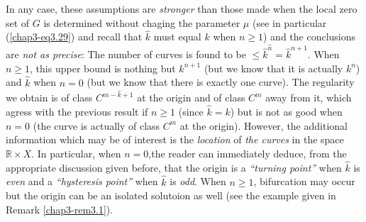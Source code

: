In any case, these assumptions are {\em stronger} than those made when
the local zero set of $G$ is determined without chaging the parameter
$\mu$ (see in particular (\ref{chap3-eq3.29}) and recall that
$\hat{k}$ must equal $k$ when $n \geq 1$) and the conclusions are {\em
  not as precise}: The number of curves is found to be $\leq
\hat{k}^{\hat{n}} = \hat{k}^{n+1}$. When $n \geq 1$, this upper bound
is nothing but $k^{n+1}$ (but we know that it is actually $k^{n}$) and
$\hat{k}$ when $n = 0$ (but we know that there is exactly one
curve). The regularity we obtain is of class $C^{m-\hat{k}+1}$ at the
origin and of class $C^{m}$ away from it, which agress with the
previous result if $n \geq 1$ (since $\hat{k} = k$) but is not as good
when $n = 0$ (the curve is actually of class $C^{m}$ at the
origin). However, the additional information which may be of interest
is the {\em location} of {\em the curves} in the space $\mathbb{R}
\times X$. In particular, when $n = 0$,\pageoriginale the reader can
immediately deduce, from the appropriate discussion given before, that
the origin is a {\em ``turning point''} when $\hat{k}$ is {\em even}
and a {\em ``hysteresis point''} when $\hat{k}$ is {\em odd}. When $n
\geq 1$, bifurcation may occur but the origin can be an isolated
solutoion as well (see the example given in Remark \ref{chap3-rem3.1}).
